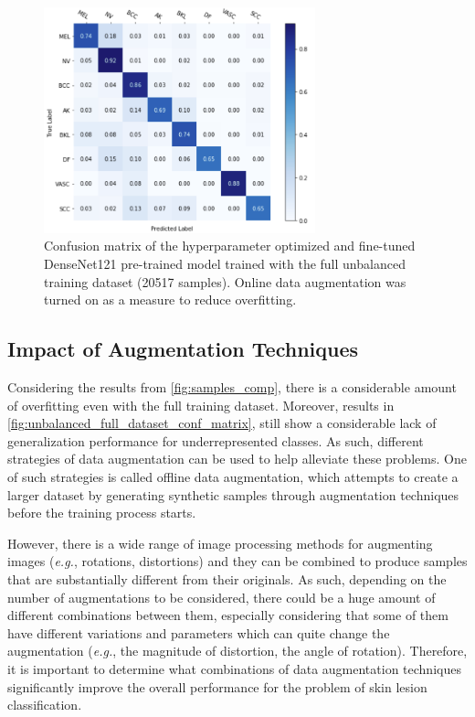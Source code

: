     \begin{figure}[ht]
        \centering
        \includegraphics[width=0.7\textwidth]{figs/densenet201_20517_unbalanced_conf_matrix.png}
        \caption[Confusion matrix of the hyperparameter optimized and fine-tuned DenseNet121 pre-trained model trained with the full unbalanced training dataset.]{Confusion matrix of the hyperparameter optimized and fine-tuned DenseNet121 pre-trained model trained with the full unbalanced training dataset (20517 samples). Online data augmentation was turned on as a measure to reduce overfitting.}
        \label{fig:unbalanced_full_dataset_conf_matrix}
    \end{figure}
    
    \subsection{Impact of Augmentation Techniques}
    \label{section:dg_impact}
    Considering the results from \autoref{fig:samples_comp}, there is a considerable amount of overfitting even with the full training dataset. Moreover, results in \autoref{fig:unbalanced_full_dataset_conf_matrix}, still show a considerable lack of generalization performance for underrepresented classes. As such, different strategies of data augmentation can be used to help alleviate these problems. One of such strategies is called offline data augmentation, which attempts to create a larger dataset by generating synthetic samples through augmentation techniques before the training process starts. \par
    
    However, there is a wide range of image processing methods for augmenting images (\textit{e.g.}, rotations, distortions) and they can be combined to produce samples that are substantially different from their originals. As such, depending on the number of augmentations to be considered, there could be a huge amount of different combinations between them, especially considering that some of them have different variations and parameters which can quite change the augmentation (\textit{e.g.}, the magnitude of distortion, the angle of rotation). Therefore, it is important to determine what combinations of data augmentation techniques significantly improve the overall performance for the problem of skin lesion classification. \par
        
